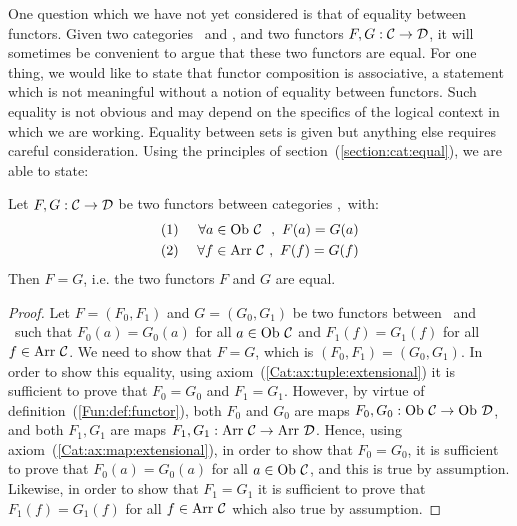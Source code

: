 One question which we have not yet considered is that of equality between
functors. Given two categories \Cat\ and \Dat, and two functors $F,G:\mbox{$\cal C$}\to\mbox{$\cal D$}$, 
it will sometimes be convenient to argue that these two functors are equal. For one 
thing, we would like to state that functor composition is associative, a statement 
which is not meaningful without a notion of equality between functors. Such equality
is not obvious and may depend on the specifics of the logical context in 
which we are working. Equality between sets is given but anything else requires
careful consideration. Using the principles of section~(\ref{section:cat:equal}), 
we are able to state: 

\begin{prop}\label{Fun:prop:equal}
    Let $F,G:\mbox{$\cal C$}\to\mbox{$\cal D$}$ be two functors between categories \Cat,\Dat\ with:
        \begin{eqnarray*}
            (1)&\ &\forall a\in\mbox{\rm Ob}\ \mbox{$\cal C$}\ \ ,\ F(a)=G(a)\\
            (2)&\ &\forall f\in\mbox{\rm Arr}\ \mbox{$\cal C$}\ ,\ F(f)=G(f)
        \end{eqnarray*}
    Then $F=G$, i.e. the two functors $F$ and $G$ are equal.
\end{prop}
\begin{proof}
    Let $F=(F_{0},F_{1})$ and $G=(G_{0},G_{1})$ be two functors between \Cat\
    and \Dat\ such that $F_{0}(a)=G_{0}(a)$ for all $a\in\mbox{\rm Ob}\ \mbox{$\cal C$}$ and 
    $F_{1}(f)=G_{1}(f)$ for all $f\in\mbox{\rm Arr}\ \mbox{$\cal C$}$. We need to show that 
    $F=G$, which is $(F_{0},F_{1})=(G_{0},G_{1})$. In order to show this
    equality, using axiom~(\ref{Cat:ax:tuple:extensional}) it is sufficient
    to prove that $F_{0}=G_{0}$ and $F_{1}=G_{1}$. However, by virtue of
    definition~(\ref{Fun:def:functor}), both $F_{0}$ and $G_{0}$ are
    maps $F_{0},G_{0}:\ob\ \Cat\to\ob\ \Dat$, and both $F_{1},G_{1}$
    are maps $F_{1},G_{1}:\arr\ \Cat\to\arr\ \Dat$. Hence, using
    axiom~(\ref{Cat:ax:map:extensional}), in order to show that $F_{0}=G_{0}$,
    it is sufficient to prove that $F_{0}(a)=G_{0}(a)$ for all $a\in\mbox{\rm Ob}\ \mbox{$\cal C$}$,
    and this is true by assumption. Likewise, in order to show that
    $F_{1}=G_{1}$ it is sufficient to prove that $F_{1}(f)=G_{1}(f)$
    for all $f\in\mbox{\rm Arr}\ \mbox{$\cal C$}$ which also true by assumption.
\end{proof}


